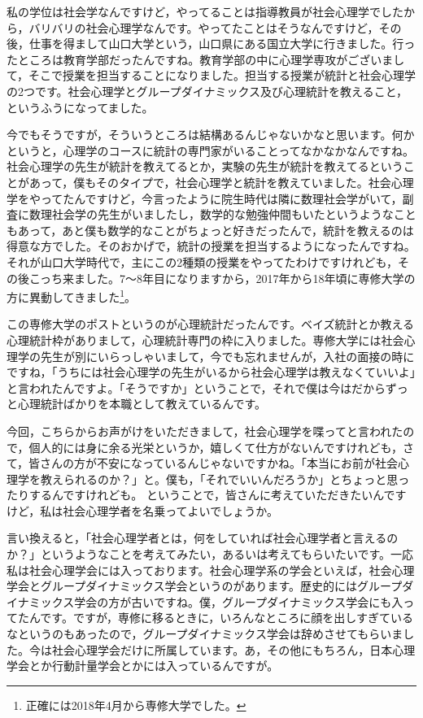 \documentclass{ltjsbook}
\begin{document}
私の学位は社会学なんですけど，やってることは指導教員が社会心理学でしたから，バリバリの社会心理学なんです。やってたことはそうなんですけど，その後，仕事を得まして山口大学という，山口県にある国立大学に行きました。行ったところは教育学部だったんですね。教育学部の中に心理学専攻がございまして，そこで授業を担当することになりました。担当する授業が統計と社会心理学の2つです。社会心理学とグループダイナミックス及び心理統計を教えること，というふうになってました。

今でもそうですが，そういうところは結構あるんじゃないかなと思います。何かというと，心理学のコースに統計の専門家がいることってなかなかなんですね。社会心理学の先生が統計を教えてるとか，実験の先生が統計を教えてるということがあって，僕もそのタイプで，社会心理学と統計を教えていました。社会心理学をやってたんですけど，今言ったように院生時代は隣に数理社会学がいて，副査に数理社会学の先生がいましたし，数学的な勉強仲間もいたというようなこともあって，あと僕も数学的なことがちょっと好きだったんで，統計を教えるのは得意な方でした。そのおかげで，統計の授業を担当するようになったんですね。それが山口大学時代で，主にこの2種類の授業をやってたわけですけれども，その後こっち来ました。7～8年目になりますから，2017年から18年頃に専修大学の方に異動してきました\footnote{正確には2018年4月から専修大学でした。}。

この専修大学のポストというのが心理統計だったんです。ベイズ統計とか教える心理統計枠がありまして，心理統計専門の枠に入りました。専修大学には社会心理学の先生が別にいらっしゃいまして，今でも忘れませんが，入社の面接の時にですね，「うちには社会心理学の先生がいるから社会心理学は教えなくていいよ」と言われたんですよ。「そうですか」ということで，それで僕は今はだからずっと心理統計ばかりを本職として教えているんです。

今回，こちらからお声がけをいただきまして，社会心理学を喋ってと言われたので，個人的には身に余る光栄というか，嬉しくて仕方がないんですけれども，さて，皆さんの方が不安になっているんじゃないですかね。「本当にお前が社会心理学を教えられるのか？」と。僕も，「それでいいんだろうか」とちょっと思ったりするんですけれども。
ということで，皆さんに考えていただきたいんですけど，私は社会心理学者を名乗ってよいでしょうか。

言い換えると，「社会心理学者とは，何をしていれば社会心理学者と言えるのか？」というようなことを考えてみたい，あるいは考えてもらいたいです。一応私は社会心理学会には入っております。社会心理学系の学会といえば，社会心理学会とグループダイナミックス学会というのがあります。歴史的にはグループダイナミックス学会の方が古いですね。僕，グループダイナミックス学会にも入ってたんです。ですが，専修に移るときに，いろんなところに顔を出しすぎているなというのもあったので，グループダイナミックス学会は辞めさせてもらいました。今は社会心理学会だけに所属しています。あ，その他にもちろん，日本心理学会とか行動計量学会とかには入っているんですが。
\end{document}
